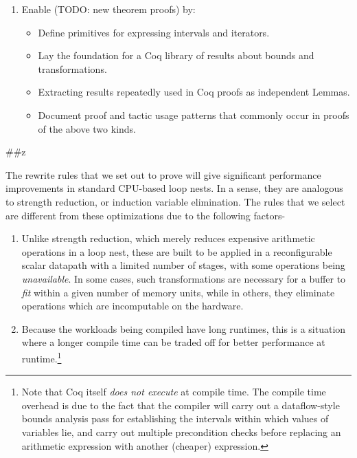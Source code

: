 \begin{enumerate}
\def\labelenumi{\arabic{enumi}.}
\setcounter{enumi}{2}
\tightlist
\item
  Enable (TODO: new theorem proofs) by:

  \begin{itemize}
  \tightlist
  \item
    Define primitives for expressing intervals and iterators.
  \item
    Lay the foundation for a Coq library of results about bounds and
    transformations.
  \item
    Extracting results repeatedly used in Coq proofs as independent
    Lemmas.
  \item
    Document proof and tactic usage patterns that commonly occur in
    proofs of the above two kinds.
  \end{itemize}
\end{enumerate}

\#\#z

The rewrite rules that we set out to prove will give significant
performance improvements in standard CPU-based loop nests. In a sense,
they are analogous to strength reduction, or induction variable
elimination. The rules that we select are different from these
optimizations due to the following factors-

\begin{enumerate}
\def\labelenumi{\arabic{enumi}.}
\item
  Unlike strength reduction, which merely reduces expensive arithmetic
  operations in a loop nest, these are built to be applied in a
  reconfigurable scalar datapath with a limited number of stages, with
  some operations being \emph{unavailable}. In some cases, such
  transformations are necessary for a buffer to \emph{fit} within a
  given number of memory units, while in others, they eliminate
  operations which are incomputable on the hardware.
\item
  Because the workloads being compiled have long runtimes, this is a
  situation where a longer compile time can be traded off for better
  performance at runtime.\footnote{Note that Coq itself \emph{does not
    execute} at compile time. The compile time overhead is due to the
    fact that the compiler will carry out a dataflow-style bounds
    analysis pass for establishing the intervals within which values of
    variables lie, and carry out multiple precondition checks before
    replacing an arithmetic expression with another (cheaper)
    expression.}
\end{enumerate}

